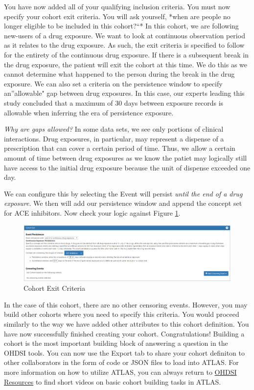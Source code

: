 \documentclass[11pt]{book}
\theoremstyle{definition}
\theoremstyle{definition}
\theoremstyle{definition}
\theoremstyle{remark}
\begin{document}
You have now added all of your qualifying inclusion criteria. You must now specify your cohort exit criteria. You will ask yourself, *when are people no longer eligible to be included in this cohort?``* In this cohort, we are following new-users of a drug exposure. We want to look at continuous observation period as it relates to the drug exposure. As such, the exit criteria is specified to follow for the entirety of the continuous drug exposure. If there is a subsequent break in the drug exposure, the patient will exit the cohort at this time. We do this as we cannot determine what happened to the person during the break in the drug exposure. We can also set a criteria on the persistence window to specify an''allowable" gap between drug exposures. In this case, our experts leading this study concluded that a maximum of 30 days between exposure records is allowable when inferring the era of persistence exposure.

\emph{Why are gaps allowed?} In some data sets, we see only portions of clinical interactions. Drug exposures, in particular, may represent a dispense of a prescription that can cover a certain period of time. Thus, we allow a certain amount of time between drug exposures as we know the patiet may logically still have access to the initial drug exposure because the unit of dispense exceeded one day.

We can configure this by selecting the Event will persist \emph{until the end of a drug exposure}. We then will add our persistence window and append the concept set for ACE inhibitors. Now check your logic against Figure \ref{fig:ATLAScohortexit}.

\begin{figure}

{\centering \includegraphics[width=0.9\linewidth]{images/Cohorts/ATLAS-cohortexit} 

}

\caption{Cohort Exit Criteria}\label{fig:ATLAScohortexit}
\end{figure}

In the case of this cohort, there are no other censoring events. However, you may build other cohorts where you need to specify this criteria. You would proceed similarly to the way we have added other attributes to this cohort definition. You have now successfully finished creating your cohort. Congratulations! Building a cohort is the most important building block of answering a question in the OHDSI tools. You can now use the Export tab to share your cohort definiton to other collaborators in the form of code or JSON files to load into ATLAS. For more information on how to utilize ATLAS, you can always return to \href{https://www.ohdsi.org/resources/}{OHDSI Resources} to find short videos on basic cohort building tasks in ATLAS.
\end{document}
